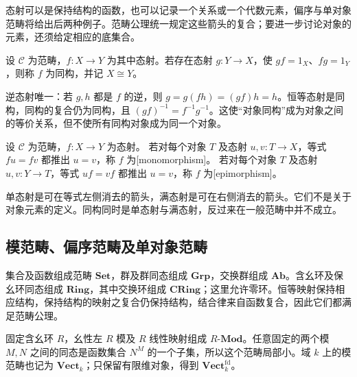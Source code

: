 \ProseParagraphBreak
态射可以是保持结构的函数，也可以记录一个关系或一个代数元素，偏序与单对象范畴将给出后两种例子。范畴公理统一规定这些箭头的复合；要进一步讨论对象的元素，还须给定相应的底集合。

\begin{definition}\label{b4:def:categorical-isomorphism}
	设 \(\mathcal C\) 为范畴，\(f:X\rightarrow Y\) 为其中态射。若存在态射 \(g:Y\rightarrow X\)，使 \(gf=1_X\)、\(fg=1_Y\)，则称 \(f\) 为同构，并记 \(X\cong Y\)。
\end{definition}

逆态射唯一：若 \(g,h\) 都是 \(f\) 的逆，则 \(g=g(fh)=(gf)h=h\)。恒等态射是同构，同构的复合仍为同构，且 \((gf)^{-1}=f^{-1}g^{-1}\)。这使“对象同构”成为对象之间的等价关系，但不使所有同构对象成为同一个对象。

\begin{definition}\label{b4:def:monomorphism-epimorphism}
	设 \(\mathcal C\) 为范畴，\(f:X\rightarrow Y\) 为态射。 若对每个对象 \(T\) 及态射 \(u,v:T\rightarrow X\)，等式 \(fu=fv\) 都推出 \(u=v\)，称 \(f\) 为[monomorphism]。 若对每个对象 \(T\) 及态射 \(u,v:Y\rightarrow T\)，等式 \(uf=vf\) 都推出 \(u=v\)，称 \(f\) 为[epimorphism]。
\end{definition}

单态射是可在等式左侧消去的箭头，满态射是可在右侧消去的箭头。它们不是关于对象元素的定义。同构同时是单态射与满态射，反过来在一般范畴中并不成立。

\subsection{模范畴、偏序范畴及单对象范畴}
\label{b4:subsec:0101:02}

集合及函数组成范畴 \(\mathbf{Set}\)，群及群同态组成 \(\mathbf{Grp}\)，交换群组成 \(\mathbf{Ab}\)。含幺环及保幺环同态组成 \(\mathbf{Ring}\)，其中交换环组成 \(\mathbf{CRing}\)；这里允许零环。恒等映射保持相应结构，保持结构的映射之复合仍保持结构，结合律来自函数复合，因此它们都满足范畴公理。

\ProseParagraphBreak
固定含幺环 \(R\)，幺性左 \(R\) 模及 \(R\) 线性映射组成 \(R\text{-}\mathbf{Mod}\)。任意固定的两个模 \(M,N\) 之间的同态是函数集合 \(N^M\) 的一个子集，所以这个范畴局部小。域 \(k\) 上的模范畴也记为 \(\mathbf{Vect}_k\)；只保留有限维对象，得到 \(\mathbf{Vect}_k^{\mathrm{fd}}\)。

